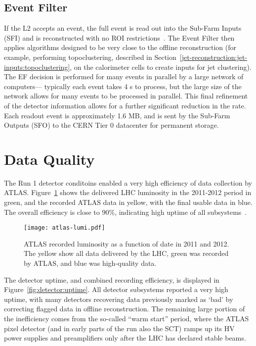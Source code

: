 \subsection{Event Filter}

If the L2 accepts an event, the full event is read out into the Sub-Farm Inputs (SFI) and is reconstructed with no ROI restrictions~\cite{ATLASPaper}. The Event Filter then applies algorithms designed to be very close to the offline reconstruction (for example, performing topoclustering, described in Section~\ref{jet-reconstruction:jet-inputs:topoclustering}, on the calorimeter cells to create inputs for jet clustering). The EF decision is performed for many events in parallel by a large network of computers--- typically each event takes 4 s to process, but the large size of the network allows for many events to be processed in parallel. This final refinement of the detector information allows for a further significant reduction in the rate. Each readout event is approximately 1.6 MB, and is sent by the Sub-Farm Outputs (SFO) to the CERN Tier 0 datacenter for permanent storage.


\section{Data Quality}
\label{atlas:data-quality}

The Run 1 detector conditoins enabled a very high efficiency of data collection by ATLAS. Figure~\ref{fig:detector:lumi} shows the delivered LHC luminosity in the 2011-2012 period in green, and the recorded ATLAS data in yellow, with the final usable data in blue. The overall efficiency is close to 90$\%$, indicating high uptime of all subsystems~\cite{ATLASDQ}.


\begin{figure}
\centering
\texttt{[image: atlas-lumi.pdf]}
\caption{ATLAS recorded luminosity as a function of date in 2011 and 2012. The yellow show all data delivered by the LHC, green was recorded by ATLAS, and blue was high-quality data.}
\label{fig:detector:lumi}
\end{figure}


The detector uptime, and combined recording efficiency, is displayed in Figure~\ref{fig:detector:uptime}. All detector subsystems reported a very high uptime, with many detectors recovering data previously marked as `bad' by correcting flagged data in offline reconstruction. The remaining large portion of the inefficiency comes from the so-called ``warm start'' period, where the ATLAS pixel detector (and in early parts of the run also the SCT) ramps up its HV power supplies and preamplifiers only after the LHC has declared stable beams.

